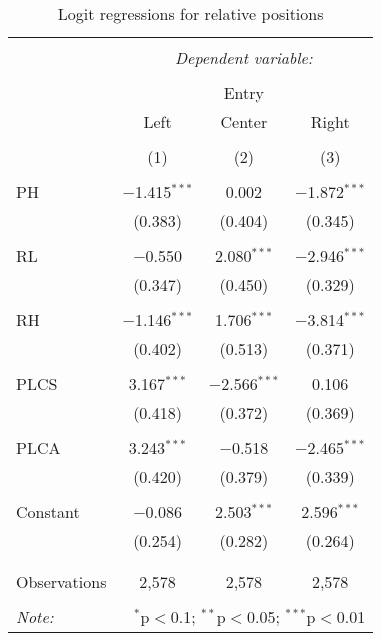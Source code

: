 \begin{table}[!htbp] \centering 
  \caption{Logit regressions for relative positions} 
  \label{tab:regression} 
\begin{tabular}{@{\extracolsep{5pt}}lccc} 
\\[-1.8ex]\hline 
\hline \\[-1.8ex] 
 & \multicolumn{3}{c}{\textit{Dependent variable:}} \\ 
\cline{2-4} 
\\[-1.8ex] & \multicolumn{3}{c}{Entry} \\ 
 & Left & Center & Right \\ 
\\[-1.8ex] & (1) & (2) & (3)\\ 
\hline \\[-1.8ex] 
 PH & $-$1.415$^{***}$ & 0.002 & $-$1.872$^{***}$ \\ 
  & (0.383) & (0.404) & (0.345) \\ 
  & & & \\ 
 RL & $-$0.550 & 2.080$^{***}$ & $-$2.946$^{***}$ \\ 
  & (0.347) & (0.450) & (0.329) \\ 
  & & & \\ 
 RH & $-$1.146$^{***}$ & 1.706$^{***}$ & $-$3.814$^{***}$ \\ 
  & (0.402) & (0.513) & (0.371) \\ 
  & & & \\ 
 PLCS & 3.167$^{***}$ & $-$2.566$^{***}$ & 0.106 \\ 
  & (0.418) & (0.372) & (0.369) \\ 
  & & & \\ 
 PLCA & 3.243$^{***}$ & $-$0.518 & $-$2.465$^{***}$ \\ 
  & (0.420) & (0.379) & (0.339) \\ 
  & & & \\ 
 Constant & $-$0.086 & 2.503$^{***}$ & 2.596$^{***}$ \\ 
  & (0.254) & (0.282) & (0.264) \\ 
  & & & \\ 
\hline \\[-1.8ex] 
Observations & 2,578 & 2,578 & 2,578 \\ 
\hline 
\hline \\[-1.8ex] 
\textit{Note:}  & \multicolumn{3}{r}{$^{*}$p$<$0.1; $^{**}$p$<$0.05; $^{***}$p$<$0.01} \\ 
\end{tabular} 
\end{table}
